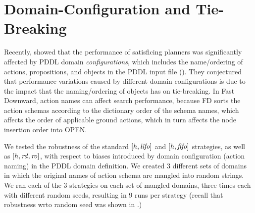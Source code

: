 \section{Domain-Configuration and Tie-Breaking}
Recently, \citeauthor{vallati2015effective} showed that the performance of 
satisficing planners was significantly affected by PDDL domain \emph{configurations}, which includes the name/ordering of actions, propositions, and objects in the PDDL input file (\citeyear{vallati2015effective}).
They conjectured that performance variations caused
by different domain configurations is due to the impact that the naming/ordering of objects has on tie-breaking.
In Fast Downward, action names can affect search performance, because FD 
sorts the action schemas according to the dictionary
order of the schema names, which affects the order of applicable ground
actions, which in turn affects the node insertion order into OPEN.


We tested the robustness of the standard $[h,\mbox{\textit{lifo}}]$ and $[h,\mbox{\textit{fifo}}]$ strategies, as well as $[h,\mbox{\textit{rd}},\mbox{\textit{ro}}]$,
with respect to 
biases introduced by domain configuration (action naming) in the PDDL domain definition.
We created 3 different sets of domains in which the
original names of action schema are mangled into random strings. 
We ran each of the 3 strategies on each
set of mangled domains, three times each with different random seeds,
resulting in 9 runs per strategy (recall that robustness wrto random seed was shown in .)

